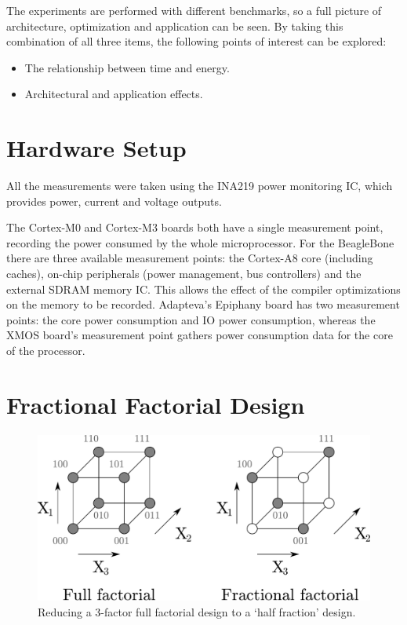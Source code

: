 \documentclass[twocolumn]{article}
\let\oldcaption\caption
\renewcommand{\caption}[1]{\oldcaption{\textup{#1}}}
\begin{document}
The experiments are performed with different benchmarks, so a full picture of architecture, optimization and application can be seen. By taking this combination of all three items, the following points of interest can be explored:
\begin{itemize}
	\setlength{\itemsep}{0em}
	\vspace{-1mm}
 	\item The relationship between time and energy.
 	\item Architectural and application effects.
 \end{itemize}

\section{Hardware Setup}

All the measurements were taken using the INA219 power monitoring IC\cite{INA219}, which provides power, current and voltage outputs.

The Cortex-M0 and Cortex-M3 boards both have a single measurement point, recording the power consumed by the whole microprocessor. For the BeagleBone there are three available measurement points: the Cortex-A8 core (including caches), on-chip peripherals (power management, bus controllers) and the external SDRAM memory IC. This allows the effect of the compiler optimizations on the memory to be recorded. Adapteva's Epiphany board has two measurement points: the core power consumption and IO power consumption, whereas the XMOS board's measurement point gathers power consumption data for the core of the processor.

\section{Fractional Factorial Design}

\begin{figure}[bt]
	\centering
	\includegraphics[width=0.9\linewidth]{ffd.pdf}
	\caption{Reducing a 3-factor full factorial design to a `half fraction' design.}
	\label{Fig:FFDTut}
\end{figure}
\end{document}
